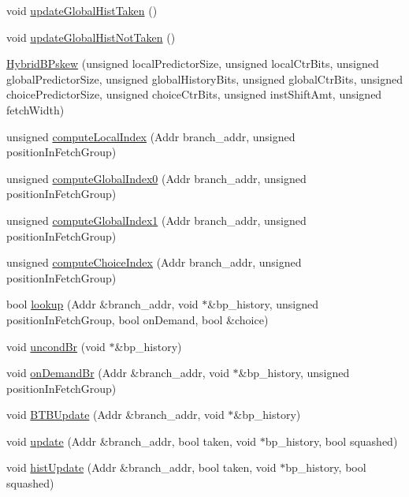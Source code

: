 \begin{DoxyCompactItemize}
void \hyperlink{classHybridBPskew_a9c1a201e37cbba10055ff63b9e072a69}{updateGlobalHistTaken} ()
\item 
void \hyperlink{classHybridBPskew_a07095043813d5f59978c0708efa58bd4}{updateGlobalHistNotTaken} ()
\item 
\hyperlink{classHybridBPskew_a039896cdd3566d98247bf7b871766cc9}{HybridBPskew} (unsigned localPredictorSize, unsigned localCtrBits, unsigned globalPredictorSize, unsigned globalHistoryBits, unsigned globalCtrBits, unsigned choicePredictorSize, unsigned choiceCtrBits, unsigned instShiftAmt, unsigned fetchWidth)
\item 
unsigned \hyperlink{classHybridBPskew_ae8b356ac60f229ce92086836420a1d11}{computeLocalIndex} (Addr branch\_\-addr, unsigned positionInFetchGroup)
\item 
unsigned \hyperlink{classHybridBPskew_a2d3c53348902a29d3315dcec78e12a99}{computeGlobalIndex0} (Addr branch\_\-addr, unsigned positionInFetchGroup)
\item 
unsigned \hyperlink{classHybridBPskew_a4009eae987557a103d5846cd32e30333}{computeGlobalIndex1} (Addr branch\_\-addr, unsigned positionInFetchGroup)
\item 
unsigned \hyperlink{classHybridBPskew_a70b7b53463dd2cd4a6394266ea3c2ee3}{computeChoiceIndex} (Addr branch\_\-addr, unsigned positionInFetchGroup)
\item 
bool \hyperlink{classHybridBPskew_a582ad543f9fc90c933eb2c740de572ec}{lookup} (Addr \&branch\_\-addr, void $\ast$\&bp\_\-history, unsigned positionInFetchGroup, bool onDemand, bool \&choice)
\item 
void \hyperlink{classHybridBPskew_a1dbffb30d1d0f0c4c8e6a8f1084e68e4}{uncondBr} (void $\ast$\&bp\_\-history)
\item 
void \hyperlink{classHybridBPskew_ab10e5603326fd6eae8d8cdd106a625ef}{onDemandBr} (Addr \&branch\_\-addr, void $\ast$\&bp\_\-history, unsigned positionInFetchGroup)
\item 
void \hyperlink{classHybridBPskew_a5ceeff1b2e0cc39822346b1cd8fbab80}{BTBUpdate} (Addr \&branch\_\-addr, void $\ast$\&bp\_\-history)
\item 
void \hyperlink{classHybridBPskew_a4fb73465bf70ab821401f3d47e44fc91}{update} (Addr \&branch\_\-addr, bool taken, void $\ast$bp\_\-history, bool squashed)
\item 
void \hyperlink{classHybridBPskew_a5e73e9324e87d820712789f33100e5f4}{histUpdate} (Addr \&branch\_\-addr, bool taken, void $\ast$bp\_\-history, bool squashed)
\item 

\end{DoxyCompactItemize}
